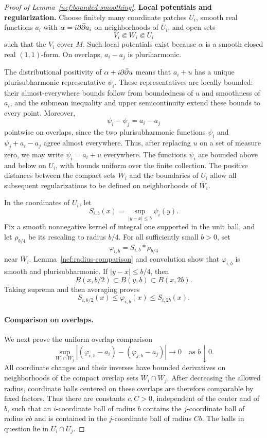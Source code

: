 \begin{proof}[Proof of Lemma~\ref{nef:bounded-smoothing}]
\textbf{Local potentials and regularization.}
Choose finitely many coordinate patches $U_i$, smooth real functions
$a_i$ with $\alpha=i\partial\bar\partial a_i$ on neighborhoods of $\overline U_i$,
and open sets
\[
 V_i\Subset W_i\Subset U_i
\]
such that the $V_i$ cover $M$. Such local potentials exist because
$\alpha$ is a smooth closed real $(1,1)$-form. On overlaps,
$a_i-a_j$ is pluriharmonic.

The distributional positivity of $\alpha+i\partial\bar\partial u$ means that
$a_i+u$ has a unique plurisubharmonic representative $\psi_i$.
These representatives are locally bounded: their almost-everywhere
bounds follow from boundedness of $u$ and smoothness of $a_i$, and
the submean inequality and upper semicontinuity extend these bounds
to every point. Moreover,
\[
 \psi_i-\psi_j=a_i-a_j
\]
pointwise on overlaps, since the two plurisubharmonic functions
$\psi_i$ and $\psi_j+a_i-a_j$ agree almost everywhere.
Thus, after replacing $u$ on a set of measure zero, we may write
$\psi_i=a_i+u$ everywhere. The functions $\psi_i$ are bounded above
and below on $U_i$, with bounds uniform over the finite collection.
The positive distances between the compact sets $\overline W_i$
and the boundaries of $U_i$ allow all subsequent regularizations
to be defined on neighborhoods of $\overline W_i$.

In the coordinates of $U_i$, let
\[
 S_{i,b}(x)=\sup_{|y-x|\leq b}\psi_i(y).
\]
Fix a smooth nonnegative kernel of integral one supported in the
unit ball, and let $\rho_{b/4}$ be its rescaling to radius $b/4$.
For all sufficiently small $b>0$, set
\[
 \varphi_{i,b}=S_{i,b}*\rho_{b/4}
\]
near $\overline W_i$.  Lemma~\ref{nef:radius-comparison} and
convolution show that $\varphi_{i,b}$ is smooth and
plurisubharmonic.  If $|y-x|\leq b/4$, then
\[
 B(x,b/2)\subset B(y,b)\subset B(x,2b).
\]
Taking suprema and then averaging proves
\begin{equation}
 S_{i,b/2}(x)\leq\varphi_{i,b}(x)\leq S_{i,2b}(x).
 \label{eq:nef-convolution-bounds}
\end{equation}

\paragraph{Comparison on overlaps.}
We next prove the uniform overlap comparison
\begin{equation}
 \sup_{W_i\cap W_j}
 \left|(\varphi_{i,b}-a_i)-(\varphi_{j,b}-a_j)\right|
 \longrightarrow0\quad\text{as }b\downarrow0.
 \label{eq:nef-overlap-comparison}
\end{equation}
All coordinate changes and their inverses have bounded derivatives
on neighborhoods of the compact overlap sets
$\overline W_i\cap\overline W_j$.  After decreasing the allowed
radius, coordinate balls centered on these overlaps are therefore
comparable by fixed factors.  Thus there are constants $c,C>0$,
independent of the center and of $b$, such that an $i$-coordinate
ball of radius $b$ contains the $j$-coordinate ball of radius $cb$
and is contained in the $j$-coordinate ball of radius $Cb$.
The balls in question lie in $U_i\cap U_j$.


\end{proof}
